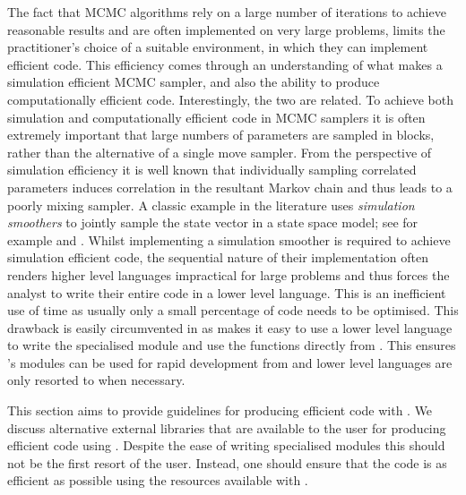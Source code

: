 \documentclass[article]{jss}
\begin{document}
The fact that MCMC algorithms rely on a large number of iterations to
achieve reasonable results and are often implemented on very large
problems, limits the practitioner's choice of a suitable environment, in
which they can implement efficient code. This efficiency comes through
an understanding of what makes a simulation efficient MCMC sampler,
and also the ability to produce computationally efficient code.
Interestingly, the two are related. To achieve both simulation and
computationally efficient code in MCMC samplers it is often extremely
important that large numbers of parameters are sampled in blocks,
rather than the alternative of a single move sampler. From the
perspective of simulation efficiency it is well known that individually
sampling correlated parameters induces correlation in the resultant
Markov chain and thus leads to a poorly mixing sampler. A classic
example in the literature uses \emph{simulation smoothers }to jointly
sample the state vector in a state space model; see for example
\citet{CarterKohn1994} and \citet{deJongShepard1995}.  Whilst
implementing a simulation smoother is required to achieve simulation
efficient code, the sequential nature of their implementation often
renders higher level languages impractical for large problems and thus
forces the analyst to write their entire code in a lower level
language. This is an inefficient use of time as usually only a small
percentage of code needs to be optimised. This drawback is easily
circumvented in  as  makes it easy to use
a lower level language to write the specialised module and use the
functions directly from . This ensures 's
modules can be used for rapid development from  and
lower level languages are only resorted to when necessary.

This section aims to provide guidelines for producing efficient code
with . We discuss alternative external libraries that are
available to the user for producing efficient code using .
Despite the ease of writing specialised modules this should not be the
first resort of the user. Instead, one should ensure that the
 code is as efficient as possible using the resources
available with .
\end{document}
